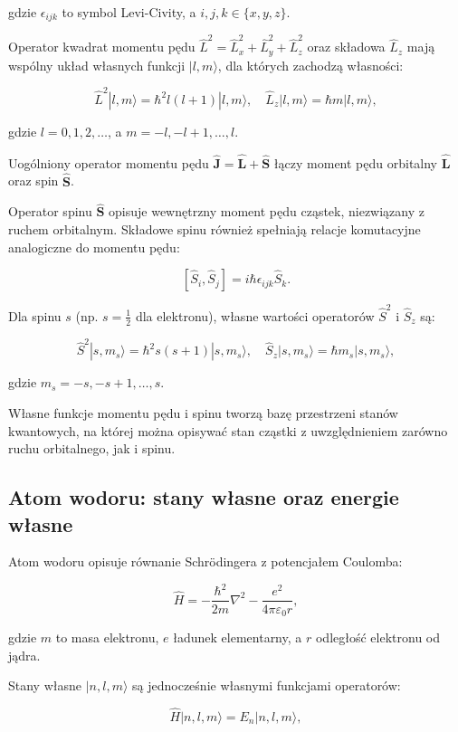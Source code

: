 gdzie \(\epsilon_{ijk}\) to symbol Levi-Civity, a \(i, j, k \in \{x,y,z\}\).

Operator kwadrat momentu pędu \(\hat{L}^2 = \hat{L}_x^2 + \hat{L}_y^2 + \hat{L}_z^2\) oraz składowa \(\hat{L}_z\) mają wspólny układ własnych funkcji \(|l, m\rangle\), dla których zachodzą własności:

\[
\hat{L}^2 |l, m\rangle = \hbar^2 l(l+1) |l, m\rangle, \quad \hat{L}_z |l, m\rangle = \hbar m |l, m\rangle,
\]

gdzie \(l = 0, 1, 2, \ldots\), a \(m = -l, -l+1, \ldots, l\).

Uogólniony operator momentu pędu \(\hat{\mathbf{J}} = \hat{\mathbf{L}} + \hat{\mathbf{S}}\) łączy moment pędu orbitalny \(\hat{\mathbf{L}}\) oraz spin \(\hat{\mathbf{S}}\).

Operator spinu \(\hat{\mathbf{S}}\) opisuje wewnętrzny moment pędu cząstek, niezwiązany z ruchem orbitalnym. Składowe spinu również spełniają relacje komutacyjne analogiczne do momentu pędu:

\[
[\hat{S}_i, \hat{S}_j] = i \hbar \epsilon_{ijk} \hat{S}_k.
\]

Dla spinu \(s\) (np. \(s = \frac{1}{2}\) dla elektronu), własne wartości operatorów \(\hat{S}^2\) i \(\hat{S}_z\) są:

\[
\hat{S}^2 |s, m_s\rangle = \hbar^2 s(s+1) |s, m_s\rangle, \quad \hat{S}_z |s, m_s\rangle = \hbar m_s |s, m_s\rangle,
\]

gdzie \(m_s = -s, -s+1, \ldots, s\).

Własne funkcje momentu pędu i spinu tworzą bazę przestrzeni stanów kwantowych, na której można opisywać stan cząstki z uwzględnieniem zarówno ruchu orbitalnego, jak i spinu.

\subsection{Atom wodoru: stany własne oraz energie własne}


Atom wodoru opisuje równanie Schrödingera z potencjałem Coulomba:

\[
\hat{H} = -\frac{\hbar^2}{2m} \nabla^2 - \frac{e^2}{4 \pi \varepsilon_0 r},
\]

gdzie \(m\) to masa elektronu, \(e\) ładunek elementarny, a \(r\) odległość elektronu od jądra.

Stany własne \(|n, l, m\rangle\) są jednocześnie własnymi funkcjami operatorów:

\[
\hat{H}|n, l, m\rangle = E_n |n, l, m\rangle,
\]

